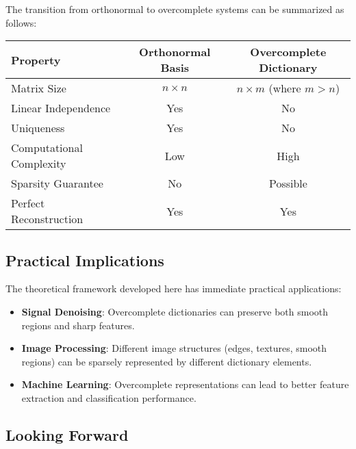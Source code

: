 \documentclass[12pt]{article}
\theoremstyle{definition}
\begin{document}
The transition from orthonormal to overcomplete systems can be summarized as follows:

\begin{center}
    \begin{tabular}{lcc}
        \toprule
        \textbf{Property}        & \textbf{Orthonormal Basis} & \textbf{Overcomplete Dictionary} \\
        \midrule
        Matrix Size              & $n \times n$               & $n \times m$ (where $m > n$)     \\
        Linear Independence      & Yes                        & No                               \\
        Uniqueness               & Yes                        & No                               \\
        Computational Complexity & Low                        & High                             \\
        Sparsity Guarantee       & No                         & Possible                         \\
        Perfect Reconstruction   & Yes                        & Yes                              \\
        \bottomrule
    \end{tabular}
\end{center}

\subsection{Practical Implications}

The theoretical framework developed here has immediate practical applications:

\begin{itemize}
    \item \textbf{Signal Denoising}: Overcomplete dictionaries can preserve both smooth regions and sharp features.
    \item \textbf{Image Processing}: Different image structures (edges, textures, smooth regions) can be sparsely represented by different dictionary elements.
    \item \textbf{Machine Learning}: Overcomplete representations can lead to better feature extraction and classification performance.
\end{itemize}

\subsection{Looking Forward}
\end{document}

